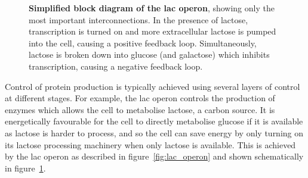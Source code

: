 \begin{figure}
  \centering
  \caption{
    \textbf{Simplified block diagram of the lac operon}, showing only the most
    important interconnections. 
    In the presence of lactose, transcription is turned on and more
    extracellular lactose is pumped into the cell, causing a positive feedback
    loop.
    Simultaneously, lactose is broken down into glucose (and galactose) which
    inhibits transcription, causing a negative feedback loop.
  }
  \label{fig:lac_block}
\end{figure}

Control of protein production is typically achieved using several layers of
control at different stages.
For example, the lac operon controls the production of enzymes which allows the
cell to metabolise lactose, a carbon source.
It is energetically favourable for the cell to directly metabolise glucose if 
it is available as
lactose is harder to process, and so the cell can save energy by only turning
on its lactose processing machinery when only lactose is available.
This is achieved by the lac operon as described in figure~\ref{fig:lac_operon} 
and shown schematically in figure~\ref{fig:lac_block}.

